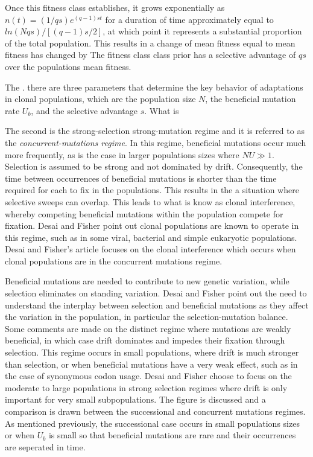 \documentclass[12pt]{article}
\begin{document}
Once this fitness class establishes, it grows exponentially as $n(t)=(1/qs)e^{(q-1)st}$ for a duration of time approximately equal to $ln(Nqs)/[(q-1)s/2]$, at which point it represents a substantial proportion of the total population.  This results in a change of mean fitness equal to  mean fitness has changed by  The fitness class class prior has a selective advantage of $qs$ over the populations mean fitness.

The . there are three parameters that determine the key behavior of adaptations in clonal populations, which are the population size $N$, the beneficial mutation rate $U_b$, and the selective advantage $s$.  What is  

The second is the strong-selection strong-mutation regime and it is referred to as the \textit{concurrent-mutations regime}. In this regime, beneficial mutations occur much more frequently, as is the case in larger populations sizes where $NU \gg 1$.  Selection is assumed to be strong and not dominated by drift.  Consequently, the time between occurrences of beneficial mutations is shorter than the time required for each to fix in the populations.  This results in the a situation where selective sweeps can overlap. This leads to what is know as clonal interference, whereby competing beneficial mutations within the population compete for fixation. Desai and Fisher point out clonal populations are known to operate in this regime, such as in some viral, bacterial and simple eukaryotic populations.  Desai and Fisher's article focuses on the clonal interference which occurs when clonal populations are in the concurrent mutations regime.  

Beneficial mutations are needed to contribute to new genetic variation, while selection eliminates on standing variation.  Desai and Fisher point out the need to understand the interplay between selection and beneficial mutations as they affect the variation in the population, in particular the selection-mutation balance.  Some comments are made on the distinct regime where mutations are weakly beneficial, in which case drift dominates and impedes their fixation through selection.  This regime occurs in small populations, where drift is much stronger than selection, or when beneficial mutations have a very weak effect, such as in the case of synonymous codon usage.  Desai and Fisher choose to focus on the moderate to large populations in strong selection regimes where drift is only important for very small subpopulations.  The figure is discussed and a comparison is drawn between the successional and concurrent mutations regimes.  As mentioned previously, the successional case occurs in small populations sizes or when $U_b$ is small so that beneficial mutations are rare and their occurrences are seperated in time.
\end{document}
